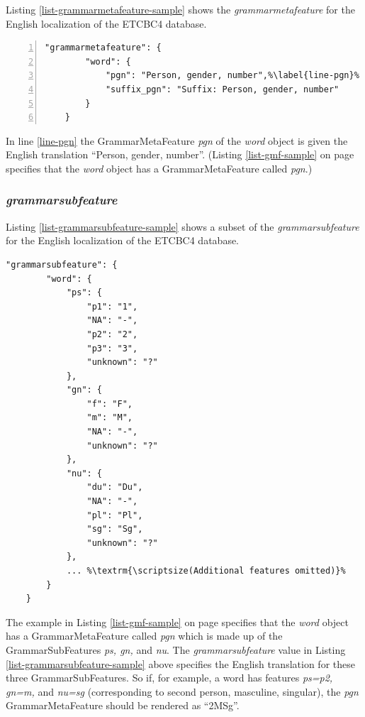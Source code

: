 \documentclass[11pt,oneside,a4paper]{memoir}
\begin{document}
Listing \ref{list-grammarmetafeature-sample} shows the \emph{grammarmetafeature} for the English
localization of the ETCBC4 database.

\begin{lstlisting}[numbers=left,caption=A sample grammarmetafeature value,label=list-grammarmetafeature-sample]
    "grammarmetafeature": {
        "word": {
            "pgn": "Person, gender, number",%\label{line-pgn}%
            "suffix_pgn": "Suffix: Person, gender, number"
        }
    }
\end{lstlisting}

In line \ref{line-pgn} the GrammarMetaFeature \emph{pgn} of the \emph{word} object is given the
English translation ``Person, gender, number''. (Listing \ref{list-gmf-sample} on page
\pageref{list-gmf-sample} specifies that the \emph{word} object has a GrammarMetaFeature called
\emph{pgn}.)

\subsubsection{\emph{grammarsubfeature}}

Listing \ref{list-grammarsubfeature-sample} shows a subset of the \emph{grammarsubfeature} for the
English localization of the ETCBC4 database.

\begin{lstlisting}[caption=A sample grammarsubfeature value,label=list-grammarsubfeature-sample]
    "grammarsubfeature": {
        "word": {
            "ps": {
                "p1": "1",
                "NA": "-",
                "p2": "2",
                "p3": "3",
                "unknown": "?"
            },
            "gn": {
                "f": "F",
                "m": "M",
                "NA": "-",
                "unknown": "?"
            },
            "nu": {
                "du": "Du",
                "NA": "-",
                "pl": "Pl",
                "sg": "Sg",
                "unknown": "?"
            },
            ... %\textrm{\scriptsize(Additional features omitted)}%
        }
    }
\end{lstlisting}

The example in Listing \ref{list-gmf-sample} on page \pageref{list-gmf-sample} specifies that the
\emph{word} object has a GrammarMetaFeature called \emph{pgn} which is made up of the
GrammarSubFeatures \emph{ps, gn,} and \emph{nu}. The \emph{grammarsubfeature} value in Listing
\ref{list-grammarsubfeature-sample} above specifies the English translation for these three
GrammarSubFeatures. So if, for example, a word has features \emph{ps=p2, gn=m,} and \emph{nu=sg}
(corresponding to second person, masculine, singular), the \emph{pgn} GrammarMetaFeature should be
rendered as ``2MSg''.
\end{document}
